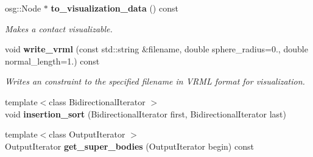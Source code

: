 \begin{DoxyCompactItemize}
\item 
osg\-::\-Node $\ast$ {\bf to\-\_\-visualization\-\_\-data} () const \label{classMoby_1_1UnilateralConstraint_a3e7b2889b3c5c1782602d9d362918514}

\begin{DoxyCompactList}\small\item\em Makes a contact visualizable. \end{DoxyCompactList}\item 
void {\bf write\-\_\-vrml} (const std\-::string \&filename, double sphere\-\_\-radius=0., double normal\-\_\-length=1.) const 
\begin{DoxyCompactList}\small\item\em Writes an constraint to the specified filename in V\-R\-M\-L format for visualization. \end{DoxyCompactList}\item 
{\footnotesize template$<$class Bidirectional\-Iterator $>$ }\\void {\bfseries insertion\-\_\-sort} (Bidirectional\-Iterator first, Bidirectional\-Iterator last)\label{classMoby_1_1UnilateralConstraint_ae8bb17ffcee453c9095068b8593faee2}

\item 
{\footnotesize template$<$class Output\-Iterator $>$ }\\Output\-Iterator {\bfseries get\-\_\-super\-\_\-bodies} (Output\-Iterator begin) const \label{classMoby_1_1UnilateralConstraint_ae4eedf2f7fbae611c060e191273f916c}

\end{DoxyCompactItemize}
